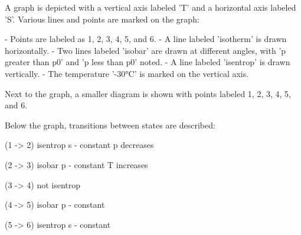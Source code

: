 A graph is depicted with a vertical axis labeled 'T' and a horizontal axis labeled 'S'. Various lines and points are marked on the graph:

- Points are labeled as 1, 2, 3, 4, 5, and 6.
- A line labeled 'isotherm' is drawn horizontally.
- Two lines labeled 'isobar' are drawn at different angles, with 'p greater than p0' and 'p less than p0' noted.
- A line labeled 'isentrop' is drawn vertically.
- The temperature '-30°C' is marked on the vertical axis.

Next to the graph, a smaller diagram is shown with points labeled 1, 2, 3, 4, 5, and 6.

Below the graph, transitions between states are described:

(1 -> 2) isentrop s - constant p decreases

(2 -> 3) isobar p - constant T increases

(3 -> 4) not isentrop

(4 -> 5) isobar p - constant

(5 -> 6) isentrop s - constant
